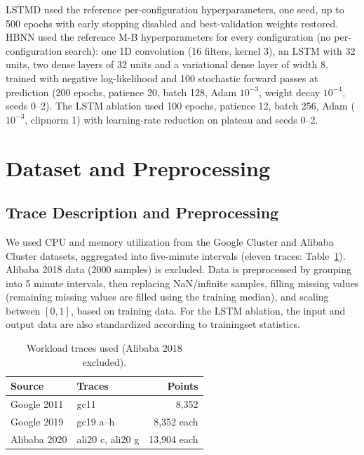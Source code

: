 \documentclass[conference]{IEEEtran}
\begin{document}
LSTMD used the reference per-configuration hyperparameters, one seed, up to 500
epochs with early stopping disabled and best-validation weights restored. HBNN
used the reference M-B hyperparameters for every configuration (no
per-configuration search): one 1D convolution (16 filters, kernel 3), an LSTM
with 32 units, two dense layers of 32 units and a variational dense layer of
width 8, trained with negative log-likelihood and 100 stochastic forward passes
at prediction (200 epochs, patience 20, batch 128, Adam $10^{-3}$, weight decay
$10^{-4}$, seeds 0--2). The LSTM ablation used 100 epochs, patience 12, batch
256, Adam ($10^{-3}$, clipnorm 1) with learning-rate reduction on plateau and
seeds 0--2.

\section{Dataset and Preprocessing}\label{dataset-and-preprocessing}

\subsection{Trace Description and Preprocessing}\label{trace-description-and-preprocessing}

We used CPU and memory utilization from the Google Cluster and Alibaba Cluster
datasets, aggregated into five-minute intervals (eleven traces:
Table~\ref{tab:traces}). Alibaba 2018 data (2000 samples) is excluded. Data is preprocessed by grouping into 5 minute intervals, then replacing NaN/infinite samples, filling missing values (remaining missing values are filled using the training median), and scaling between $[0,1]$, based on training data. For the LSTM ablation, the input and output data are also standardized according to trainingset statistics.

\begin{table}[!t]
\caption{Workload traces used (Alibaba 2018 excluded).}
\label{tab:traces}
\centering
\scriptsize
\begin{tabular}{@{}llr@{}}
\toprule
Source & Traces & Points \\
\midrule
Google 2011 & gc11 & 8,352 \\
Google 2019 & gc19 a--h & 8,352 each \\
Alibaba 2020 & ali20 c, ali20 g & 13,904 each \\
\bottomrule
\end{tabular}
\end{table}
\end{document}
